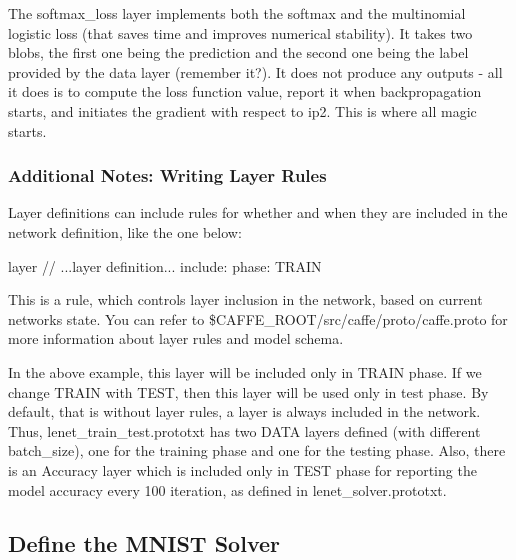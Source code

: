 The {\ttfamily softmax\+\_\+loss} layer implements both the softmax and the multinomial logistic loss (that saves time and improves numerical stability). It takes two blobs, the first one being the prediction and the second one being the {\ttfamily label} provided by the data layer (remember it?). It does not produce any outputs -\/ all it does is to compute the loss function value, report it when backpropagation starts, and initiates the gradient with respect to {\ttfamily ip2}. This is where all magic starts.

\subsubsection*{Additional Notes\+: Writing Layer Rules}

Layer definitions can include rules for whether and when they are included in the network definition, like the one below\+: \begin{DoxyVerb}layer {
  // ...layer definition...
  include: { phase: TRAIN }
}
\end{DoxyVerb}


This is a rule, which controls layer inclusion in the network, based on current network\textquotesingle{}s state. You can refer to {\ttfamily \$\+C\+A\+F\+F\+E\+\_\+\+R\+O\+OT/src/caffe/proto/caffe.proto} for more information about layer rules and model schema.

In the above example, this layer will be included only in {\ttfamily T\+R\+A\+IN} phase. If we change {\ttfamily T\+R\+A\+IN} with {\ttfamily T\+E\+ST}, then this layer will be used only in test phase. By default, that is without layer rules, a layer is always included in the network. Thus, {\ttfamily lenet\+\_\+train\+\_\+test.\+prototxt} has two {\ttfamily D\+A\+TA} layers defined (with different {\ttfamily batch\+\_\+size}), one for the training phase and one for the testing phase. Also, there is an {\ttfamily Accuracy} layer which is included only in {\ttfamily T\+E\+ST} phase for reporting the model accuracy every 100 iteration, as defined in {\ttfamily lenet\+\_\+solver.\+prototxt}.

\subsection*{Define the M\+N\+I\+ST Solver}

